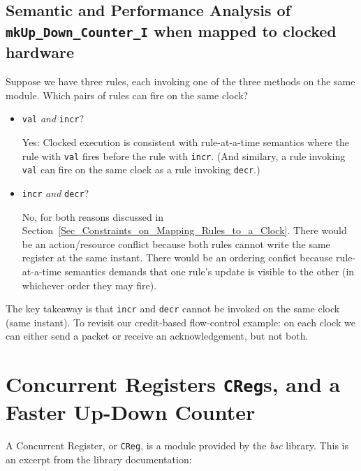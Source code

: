 \subsection{Semantic and Performance Analysis of {\tt
            mkUp\_Down\_Counter\_I} when mapped to clocked hardware}

Suppose we have three rules, each invoking one of the three methods on
the same module.  Which pairs of rules can fire on the same clock?

\begin{itemize}

 \item \verb|val| \emph{and} \verb|incr|?

       Yes: Clocked execution is consistent with rule-at-a-time
       semantics where the rule with \verb|val| fires before the rule
       with \verb|incr|.  (And similary, a rule invoking \verb|val|
       can fire on the same clock as a rule invoking \verb|decr|.)

 \item \verb|incr| \emph{and} \verb|decr|?

       No, for both reasons discussed in
       Section~\ref{Sec_Constraints_on_Mapping_Rules_to_a_Clock}.
       There would be an action/resource conflict because both rules
       cannot write the same register at the same instant.  There
       would be an ordering confict because rule-at-a-time semantics
       demands that one rule's update is visible to the other (in
       whichever order they may fire).

\end{itemize}

The key takeaway is that \verb|incr| and \verb|decr| cannot be invoked
on the same clock (same instant).  To revisit our credit-based
flow-control example: on each clock we can either send a packet or
receive an acknowledgement, but not both.


\section{Concurrent Registers {\tt CReg}s, and a Faster Up-Down Counter}

\label{Sec_CRegs}

A Concurrent Register, or \verb|CReg|, is a module provided by the
\emph{bsc} library.  This is an excerpt from the library documentation:


